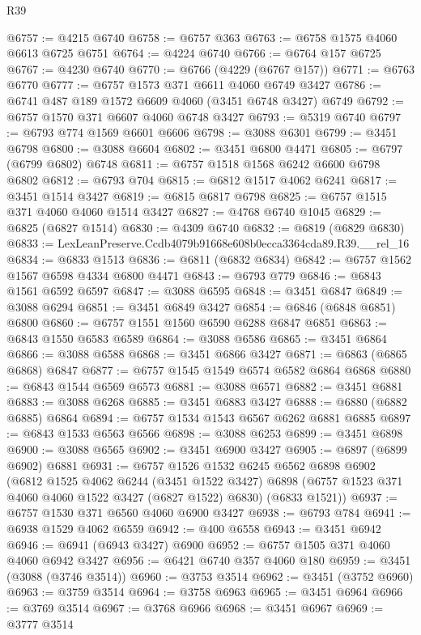 \begin{lexlean}{R39}
\begin{coremodule}
@6757 := @4215 @6740
@6758 := @6757 @363
@6763 := @6758 @1575 @4060 @6613 @6725 @6751
@6764 := @4224 @6740
@6766 := @6764 @157 @6725
@6767 := @4230 @6740
@6770 := @6766 (@4229 (@6767 @157))
@6771 := @6763 @6770
@6777 := @6757 @1573 @371 @6611 @4060 @6749 @3427
@6786 := @6741 @487 @189 @1572 @6609 @4060 (@3451 @6748 @3427) @6749
@6792 := @6757 @1570 @371 @6607 @4060 @6748 @3427
@6793 := @5319 @6740
@6797 := @6793 @774 @1569 @6601 @6606
@6798 := @3088 @6301
@6799 := @3451 @6798
@6800 := @3088 @6604
@6802 := @3451 @6800 @4471
@6805 := @6797 (@6799 @6802) @6748
@6811 := @6757 @1518 @1568 @6242 @6600 @6798 @6802
@6812 := @6793 @704
@6815 := @6812 @1517 @4062 @6241
@6817 := @3451 @1514 @3427
@6819 := @6815 @6817 @6798
@6825 := @6757 @1515 @371 @4060 @4060 @1514 @3427
@6827 := @4768 @6740 @1045
@6829 := @6825 (@6827 @1514)
@6830 := @4309 @6740
@6832 := @6819 (@6829 @6830)
@6833 := LexLeanPreserve.Ccdb4079b91668e608b0ecca3364cda89.R39.__rel_16
@6834 := @6833 @1513
@6836 := @6811 (@6832 @6834)
@6842 := @6757 @1562 @1567 @6598 @4334 @6800 @4471
@6843 := @6793 @779
@6846 := @6843 @1561 @6592 @6597
@6847 := @3088 @6595
@6848 := @3451 @6847
@6849 := @3088 @6294
@6851 := @3451 @6849 @3427
@6854 := @6846 (@6848 @6851) @6800
@6860 := @6757 @1551 @1560 @6590 @6288 @6847 @6851
@6863 := @6843 @1550 @6583 @6589
@6864 := @3088 @6586
@6865 := @3451 @6864
@6866 := @3088 @6588
@6868 := @3451 @6866 @3427
@6871 := @6863 (@6865 @6868) @6847
@6877 := @6757 @1545 @1549 @6574 @6582 @6864 @6868
@6880 := @6843 @1544 @6569 @6573
@6881 := @3088 @6571
@6882 := @3451 @6881
@6883 := @3088 @6268
@6885 := @3451 @6883 @3427
@6888 := @6880 (@6882 @6885) @6864
@6894 := @6757 @1534 @1543 @6567 @6262 @6881 @6885
@6897 := @6843 @1533 @6563 @6566
@6898 := @3088 @6253
@6899 := @3451 @6898
@6900 := @3088 @6565
@6902 := @3451 @6900 @3427
@6905 := @6897 (@6899 @6902) @6881
@6931 := @6757
    @1526
    @1532
    @6245
    @6562
    @6898
    @6902
    (@6812
      @1525
      @4062
      @6244
      (@3451 @1522 @3427)
      @6898
      (@6757 @1523 @371 @4060 @4060 @1522 @3427 (@6827 @1522) @6830)
      (@6833 @1521))
@6937 := @6757 @1530 @371 @6560 @4060 @6900 @3427
@6938 := @6793 @784
@6941 := @6938 @1529 @4062 @6559
@6942 := @400 @6558
@6943 := @3451 @6942
@6946 := @6941 (@6943 @3427) @6900
@6952 := @6757 @1505 @371 @4060 @4060 @6942 @3427
@6956 := @6421 @6740 @357 @4060 @180
@6959 := @3451 (@3088 (@3746 @3514))
@6960 := @3753 @3514
@6962 := @3451 (@3752 @6960)
@6963 := @3759 @3514
@6964 := @3758 @6963
@6965 := @3451 @6964
@6966 := @3769 @3514
@6967 := @3768 @6966
@6968 := @3451 @6967
@6969 := @3777 @3514

\end{coremodule}
\end{lexlean}
